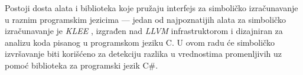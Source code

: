 Postoji dosta alata i biblioteka koje pružaju interfejs za simboličko izračunavanje u raznim programskim jezicima --- jedan od najpoznatijih alata za simboličko izračunavanje je \emph{KLEE} \cite{KLEE}, izgrađen nad \emph{LLVM} infrastruktorom \cite{LLVM} i dizajniran za analizu koda pisanog u programskom jeziku C. U ovom radu će simboličko izvršavanje biti korišćeno za detekciju razlika u vrednostima promenljivih uz pomoć biblioteka za programski jezik C\#.
